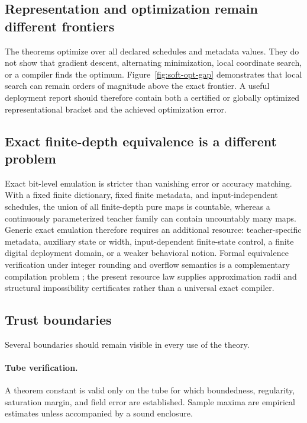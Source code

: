 \documentclass[twoside,11pt]{article}
\begin{document}
\subsection{Representation and optimization remain different frontiers}

The theorems optimize over all declared schedules and metadata values.  They do not show that gradient descent, alternating minimization, local coordinate search, or a compiler finds the optimum.  Figure~\ref{fig:soft-opt-gap} demonstrates that local search can remain orders of magnitude above the exact frontier.  A useful deployment report should therefore contain both a certified or globally optimized representational bracket and the achieved optimization error.

\subsection{Exact finite-depth equivalence is a different problem}
\label{sec:exactness-discussion-main}

Exact bit-level emulation is stricter than vanishing error or accuracy matching.  With a fixed finite dictionary, fixed finite metadata, and input-independent schedules, the union of all finite-depth pure maps is countable, whereas a continuously parameterized teacher family can contain uncountably many maps.  Generic exact emulation therefore requires an additional resource: teacher-specific metadata, auxiliary state or width, input-dependent finite-state control, a finite digital deployment domain, or a weaker behavioral notion.  Formal equivalence verification under integer rounding and overflow semantics is a complementary compilation problem \citep{TeuberEtAl2021Equivalence}; the present resource law supplies approximation radii and structural impossibility certificates rather than a universal exact compiler.

\subsection{Trust boundaries}

Several boundaries should remain visible in every use of the theory.

\paragraph{Tube verification.}
A theorem constant is valid only on the tube for which boundedness, regularity, saturation margin, and field error are established.  Sample maxima are empirical estimates unless accompanied by a sound enclosure.
\end{document}
